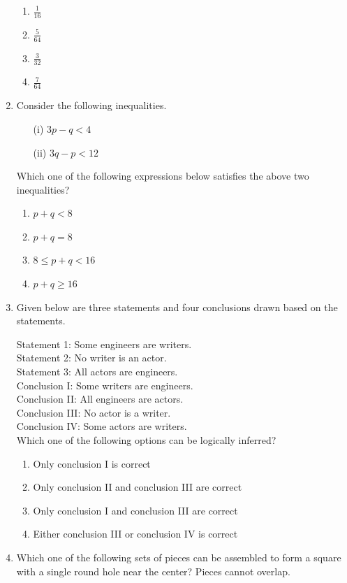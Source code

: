 \documentclass[journal,12pt,onecolumn]{exam}
\theoremstyle{remark}
\begin{document}
\begin{enumerate}
    \begin{enumerate}
        \item \( \frac{1}{16} \)
        \item \( \frac{5}{64} \)
        \item \( \frac{3}{32} \)
        \item \( \frac{7}{64} \)
    \end{enumerate}
    \vspace{2em}
     \item Consider the following inequalities.
    \begin{itemize}
        \item[(i)] \( 3p - q < 4 \)
        \item[(ii)] \( 3q - p < 12 \)
    \end{itemize}
    Which one of the following expressions below satisfies the above two inequalities?

    \begin{enumerate}[label=(\Alph*)]
        \item \( p + q < 8 \)
        \item \( p + q = 8 \)
        \item \( 8 \leq p + q < 16 \)
        \item \( p + q \geq 16 \)
    \end{enumerate}
    \newpage
     \item Given below are three statements and four conclusions drawn based on the statements.

    Statement 1: Some engineers are writers.\\
    Statement 2: No writer is an actor.\\
    Statement 3: All actors are engineers.\\

    \vspace{0.3em}
    Conclusion I: Some writers are engineers.\\
    Conclusion II: All engineers are actors.\\
    Conclusion III: No actor is a writer.\\
    Conclusion IV: Some actors are writers.\\

    Which one of the following options can be logically inferred?

    \begin{enumerate}
        \item Only conclusion I is correct
        \item Only conclusion II and conclusion III are correct
        \item Only conclusion I and conclusion III are correct
        \item Either conclusion III or conclusion IV is correct
    \end{enumerate}
    \item Which one of the following sets of pieces can be assembled to form a square with a single round hole near the center? Pieces cannot overlap.


\end{enumerate}
\end{document}
